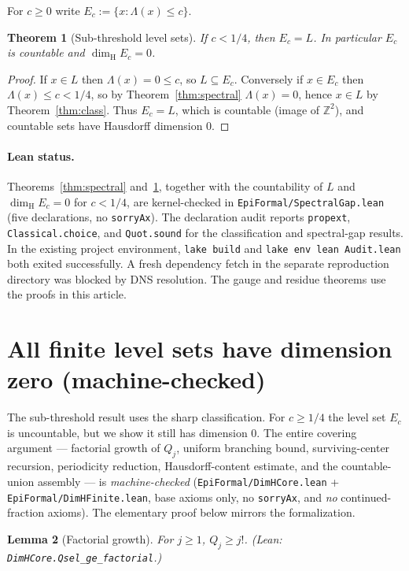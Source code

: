 \documentclass[11pt]{article}
\newtheorem{theorem}{Theorem}
\newtheorem{lemma}[theorem]{Lemma}
\theoremstyle{definition}
\theoremstyle{remark}
\newcommand{\Z}{\mathbb{Z}}
\newcommand{\dimH}{\dim_{\mathrm{H}}}
\newcommand{\Lam}{\Lambda}
\begin{document}
For $c\ge0$ write $E_c:=\{x:\Lam(x)\le c\}$.

\begin{theorem}[Sub-threshold level sets]\label{thm:sub}
If $c<1/4$, then $E_c=L$. In particular $E_c$ is countable and
$\dimH E_c=0$.
\end{theorem}

\begin{proof}
If $x\in L$ then $\Lam(x)=0\le c$, so $L\subseteq E_c$. Conversely if
$x\in E_c$ then $\Lam(x)\le c<1/4$, so by Theorem~\ref{thm:spectral}
$\Lam(x)=0$, hence $x\in L$ by Theorem~\ref{thm:class}. Thus $E_c=L$, which is
countable (image of $\Z^2$), and countable sets have Hausdorff dimension $0$.
\end{proof}

\paragraph{Lean status.} Theorems~\ref{thm:spectral} and~\ref{thm:sub}, together
with the countability of $L$ and $\dimH E_c=0$ for $c<1/4$, are kernel-checked in
\texttt{EpiFormal/SpectralGap.lean} (five declarations, no \texttt{sorryAx}).
The declaration audit reports \texttt{propext}, \texttt{Classical.choice}, and
\texttt{Quot.sound} for the classification and spectral-gap results.
In the existing project environment, \texttt{lake build} and
\texttt{lake env lean Audit.lean} both exited successfully. A fresh
dependency fetch in the separate reproduction directory was blocked by
DNS resolution. The gauge and residue theorems use the proofs in this article.

\section{All finite level sets have dimension zero (machine-checked)}

The sub-threshold result uses the sharp classification. For $c\ge1/4$ the level
set $E_c$ is uncountable, but we show it still has dimension $0$. The entire
covering argument --- factorial growth of $Q_j$, uniform branching bound,
surviving-center recursion, periodicity reduction, Hausdorff-content estimate,
and the countable-union assembly --- is \emph{machine-checked}
(\texttt{EpiFormal/DimHCore.lean} + \texttt{EpiFormal/DimHFinite.lean}, base
axioms only, no \texttt{sorryAx}, and \emph{no} continued-fraction axioms).
The elementary proof below mirrors the formalization.

\begin{lemma}[Factorial growth]\label{lem:factorial}
For $j\ge1$, $Q_j\ge j!$. (Lean: \texttt{DimHCore.\allowbreak Qsel\_ge\_factorial}.)
\end{lemma}
\end{document}
